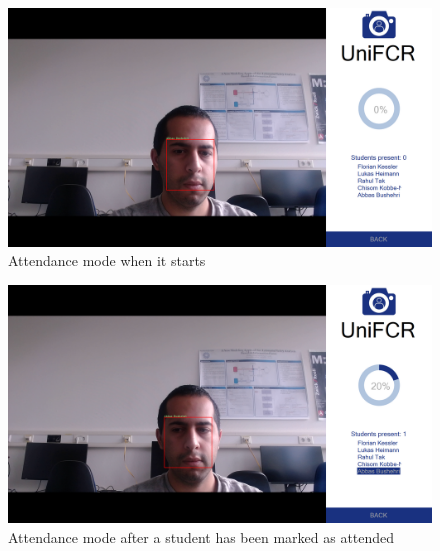 \documentclass[12pt, a4paper]{article}
\begin{document}
\begin{figure}[H]
  \centering
    \includegraphics[width=1.0\textwidth]{images/before}
    \caption{Attendance mode when it starts}
    \label{fig:before}
  \end{figure}

 \begin{figure}[H]
    \includegraphics[width=1.0\textwidth]{images/after}
    \caption{Attendance mode after a student has been marked as attended}
    \label{fig:after}
 \end{figure}
\end{document}
